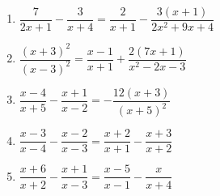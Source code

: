\documentclass{article}
\begin{document}
\begin{enumerate}[label=\bfseries\small 142.\arabic*, itemsep=4cm]
\item $\dfrac{7}{2x + 1} - \dfrac{3}{x + 4} = \dfrac{2}{x + 1} - \dfrac{3(x + 1)}{2x^2 + 9x + 4}$

\item $\dfrac{(x + 3)^2}{(x - 3)^2} = \dfrac{x - 1}{x + 1} + \dfrac{2(7x + 1)}{x^2 - 2x - 3}$

\item $\dfrac{x - 4}{x + 5} - \dfrac{x + 1}{x - 2} = -\dfrac{12(x + 3)}{(x + 5)^2}$

\item $\dfrac{x - 3}{x - 4} - \dfrac{x - 2}{x - 3} = \dfrac{x + 2}{x + 1} - \dfrac{x + 3}{x + 2}$

\item $\dfrac{x + 6}{x + 2} - \dfrac{x + 1}{x - 3} = \dfrac{x - 5}{x - 1} - \dfrac{x}{x + 4}$


\end{enumerate}
\end{document}
